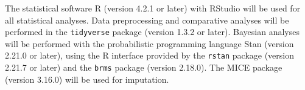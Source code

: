 \documentclass{article}
\begin{document}
The statistical software R (version 4.2.1 or later) with RStudio will be used for all statistical analyses. Data preprocessing and comparative analyses will be performed in the \texttt{tidyverse} package (version 1.3.2 or later). Bayesian analyses will be performed with the probabilistic programming language Stan (version 2.21.0 or later), using the R interface provided by the \texttt{rstan} package (version 2.21.7 or later) and the \texttt{brms} package (version 2.18.0). The MICE package (version 3.16.0) will be used for imputation.



\end{document}
